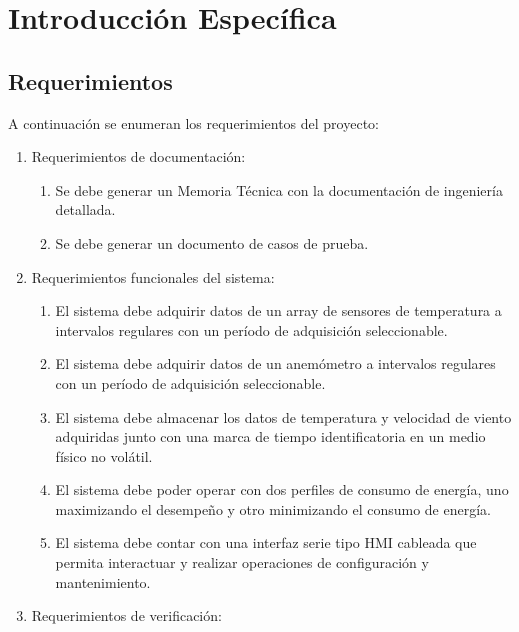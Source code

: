\chapter{Introducción Específica} %

\label{Chapter2}

\section{Requerimientos}
\label{sec:requerimientos}

A continuación se enumeran los requerimientos del proyecto:

\begin{enumerate}
  \item Requerimientos de documentación:
   \begin{enumerate}
     \item Se debe generar un Memoria Técnica con la documentación de ingeniería detallada.
	   \item Se debe generar un documento de casos de prueba.
	 \end{enumerate}
	\item Requerimientos funcionales del sistema:
	\begin{enumerate}
		\item El sistema debe adquirir datos de un array de sensores de temperatura a intervalos regulares con un período de adquisición seleccionable.
		\item El sistema debe adquirir datos de un anemómetro a intervalos regulares con un período de adquisición seleccionable.
		\item El sistema debe almacenar los datos de temperatura y velocidad de viento adquiridas junto con una marca de tiempo identificatoria en un medio físico no volátil.
		\item El sistema debe poder operar con dos perfiles de consumo de energía, uno maximizando el desempeño y otro minimizando el consumo de energía.
		\item El sistema debe contar con una interfaz serie tipo HMI cableada que permita interactuar y realizar operaciones de configuración y mantenimiento.
	\end{enumerate}
	\item Requerimientos de verificación:
	\begin{enumerate}

\end{enumerate}
\end{enumerate}
